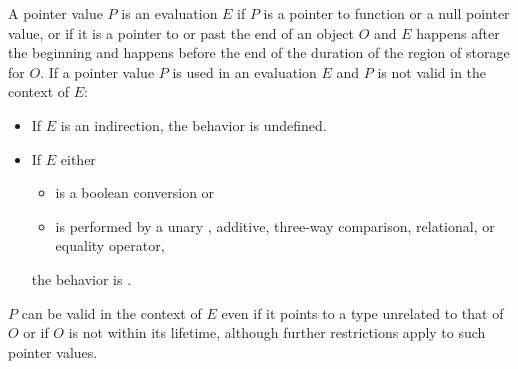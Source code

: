 \pnum
A pointer value $P$ is
%
 an evaluation $E$
if $P$ is a pointer to function or a null pointer value, or
if it is a pointer to or past the end of an object $O$ and
$E$ happens after the beginning
and happens before the end of the duration of the region of storage for $O$.
If a pointer value $P$ is used in an evaluation $E$ and
$P$ is not valid in the context of $E$:
\begin{itemize}
\item If $E$ is an indirection,
the behavior is undefined.
%
%
%
%
%
\item If $E$ either
\begin{itemize}
\item is a boolean conversion or
\item is performed by
a unary \tcode{+}, additive, three-way comparison, relational, or equality
operator,
\end{itemize}
the behavior is .
\end{itemize}
\begin{note}
$P$ can be valid in the context of $E$ even
if it points to a type unrelated to that of $O$ or
if $O$ is not within its lifetime,
although further restrictions apply
to such pointer values.
\end{note}


